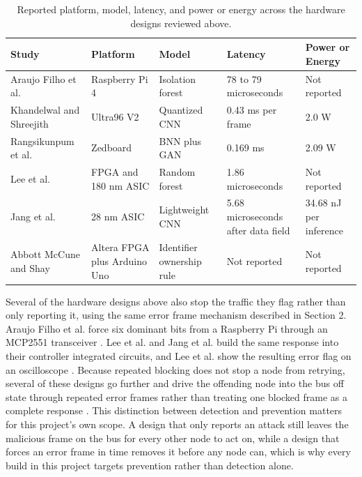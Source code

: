 \documentclass[11pt]{article}
\begin{document}
\begin{table}[t]
\centering
\small
\caption{Reported platform, model, latency, and power or energy across the hardware designs reviewed above.}
\begin{tabular}{P{2.6cm}P{2.4cm}P{2.7cm}P{3.1cm}P{3.1cm}}
\toprule
Study & Platform & Model & Latency & Power or Energy \\
\midrule
Araujo Filho et al. \cite{araujofilho2021} & Raspberry Pi 4 & Isolation forest & 78 to 79 microseconds & Not reported \\
Khandelwal and Shreejith \cite{khandelwal2022fpl} & Ultra96 V2 & Quantized CNN & 0.43 ms per frame & 2.0 W \\
Rangsikunpum et al. \cite{rangsikunpum2024bids} & Zedboard & BNN plus GAN & 0.169 ms & 2.09 W \\
Lee et al. \cite{lee2025asic} & FPGA and 180 nm ASIC & Random forest & 1.86 microseconds & Not reported \\
Jang et al. \cite{jang2026electronics} & 28 nm ASIC & Lightweight CNN & 5.68 microseconds after data field & 34.68 nJ per inference \\
Abbott McCune and Shay \cite{abbottmccune2016} & Altera FPGA plus Arduino Uno & Identifier ownership rule & Not reported & Not reported \\
\bottomrule
\end{tabular}
\end{table}

Several of the hardware designs above also stop the traffic they flag rather than only reporting it, using the same error frame mechanism described in Section 2. Araujo Filho et al. force six dominant bits from a Raspberry Pi through an MCP2551 transceiver \cite{araujofilho2021}. Lee et al. and Jang et al. build the same response into their controller integrated circuits, and Lee et al. show the resulting error flag on an oscilloscope \cite{lee2025asic,jang2026electronics}. Because repeated blocking does not stop a node from retrying, several of these designs go further and drive the offending node into the bus off state through repeated error frames rather than treating one blocked frame as a complete response \cite{donadel2025,lee2025asic,pese2025michican}. This distinction between detection and prevention matters for this project's own scope. A design that only reports an attack still leaves the malicious frame on the bus for every other node to act on, while a design that forces an error frame in time removes it before any node can, which is why every build in this project targets prevention rather than detection alone.
\end{document}
